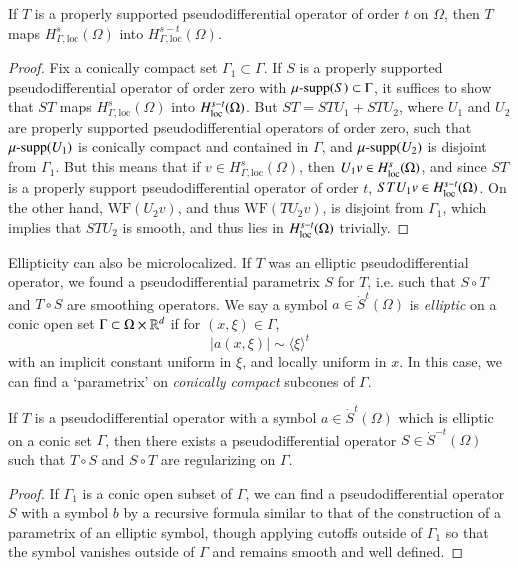 \begin{theorem}
    If $T$ is a properly supported pseudodifferential operator of order $t$ on $\Omega$, then $T$ maps $H^s_{\Gamma,\text{loc}}(\Omega)$ into $H^{s-t}_{\Gamma,\text{loc}}(\Omega)$.
\end{theorem}
\begin{proof}
    Fix a conically compact set $\Gamma_1 \subset \Gamma$. If $S$ is a properly supported pseudodifferential operator of order zero with $\operatorname{\text{$\mu$-supp}}(S) \subset \Gamma$, it suffices to show that $ST$ maps $H^s_{\Gamma,\text{loc}}(\Omega)$ into $H^{s-t}_{\text{loc}}(\Omega)$. But $ST = STU_1 + STU_2$, where $U_1$ and $U_2$ are properly supported pseudodifferential operators of order zero, such that $\operatorname{\text{$\mu$-supp}}(U_1)$ is conically compact and contained in $\Gamma$, and $\operatorname{\text{$\mu$-supp}}(U_2)$ is disjoint from $\Gamma_1$. But this means that if $v \in H^s_{\Gamma,\text{loc}}(\Omega)$, then $U_1 v \in H^s_{\text{loc}}(\Omega)$, and since $ST$ is a properly support pseudodifferential operator of order $t$, $STU_1 v \in H^{s-t}_{\text{loc}}(\Omega)$. On the other hand, $\text{WF}(U_2 v)$, and thus $\text{WF}(TU_2 v)$, is disjoint from $\Gamma_1$, which implies that $STU_2$ is smooth, and thus lies in $H^{s-t}_{\text{loc}}(\Omega)$ trivially.
\end{proof}

Ellipticity can also be microlocalized. If $T$ was an elliptic pseudodifferential operator, we found a pseudodifferential parametrix $S$ for $T$, i.e. such that $S \circ T$ and $T \circ S$ are smoothing operators. We say a symbol $a \in \dot{S}^t(\Omega)$ is \emph{elliptic} on a conic open set $\Gamma \subset \Omega \times \operatorname{\mathbb{R}}^d$ if for $(x,\xi) \in \Gamma$,
%
\[ |a(x,\xi)| \sim \langle \xi \rangle^t \]
%
with an implicit constant uniform in $\xi$, and locally uniform in $x$. In this case, we can find a `parametrix' on \emph{conically compact} subcones of $\Gamma$.

\begin{theorem}
    If $T$ is a pseudodifferential operator with a symbol $a \in \dot{S}^t(\Omega)$ which is elliptic on a conic set $\Gamma$, then there exists a pseudodifferential operator $S \in \dot{S}^{-t}(\Omega)$ such that $T \circ S$ and $S \circ T$ are regularizing on $\Gamma$.
\end{theorem}
\begin{proof}
    If $\Gamma_1$ is a conic open subset of $\Gamma$, we can find a pseudodifferential operator $S$ with a symbol $b$ by a recursive formula similar to that of the construction of a parametrix of an elliptic symbol, though applying cutoffs outside of $\Gamma_1$ so that the symbol vanishes outside of $\Gamma$ and remains smooth and well defined.
\end{proof}

